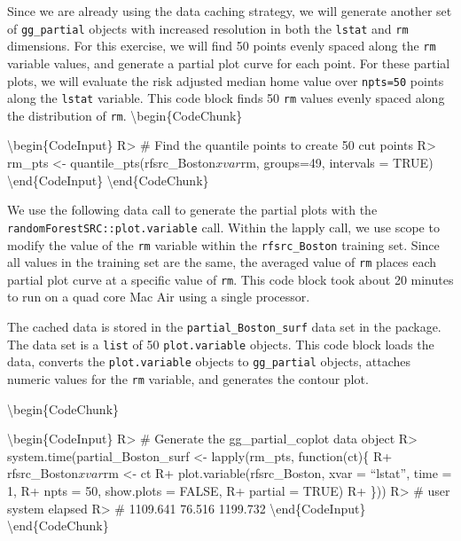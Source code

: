 \documentclass[article]{jss}
\begin{document}
Since we are already using the data caching strategy, we will generate
another set of \texttt{gg\_partial} objects with increased resolution in
both the \texttt{lstat} and \texttt{rm} dimensions. For this exercise,
we will find 50 points evenly spaced along the \texttt{rm} variable
values, and generate a partial plot curve for each point. For these
partial plots, we will evaluate the risk adjusted median home value over
\texttt{npts=50} points along the \texttt{lstat} variable. This code
block finds 50 \texttt{rm} values evenly spaced along the distribution
of \texttt{rm}. \textbackslash{}begin\{CodeChunk\}

\textbackslash{}begin\{CodeInput\} R\textgreater{} \# Find the quantile
points to create 50 cut points R\textgreater{} rm\_pts \textless{}-
quantile\_pts(rfsrc\_Boston\(xvar\)rm, groups=49, intervals = TRUE)
\textbackslash{}end\{CodeInput\} \textbackslash{}end\{CodeChunk\}

We use the following data call to generate the partial plots with the
\texttt{randomForestSRC::plot.variable} call. Within the lapply call, we
use scope to modify the value of the \texttt{rm} variable within the
\texttt{rfsrc\_Boston} training set. Since all values in the training
set are the same, the averaged value of \texttt{rm} places each partial
plot curve at a specific value of \texttt{rm}. This code block took
about 20 minutes to run on a quad core Mac Air using a single processor.

The cached data is stored in the \texttt{partial\_Boston\_surf} data set
in the  package. The data set is a \texttt{list} of
50 \texttt{plot.variable} objects. This code block loads the data,
converts the \texttt{plot.variable} objects to \texttt{gg\_partial}
objects, attaches numeric values for the \texttt{rm} variable, and
generates the contour plot.

\textbackslash{}begin\{CodeChunk\}

\textbackslash{}begin\{CodeInput\} R\textgreater{} \# Generate the
gg\_partial\_coplot data object R\textgreater{}
system.time(partial\_Boston\_surf \textless{}- lapply(rm\_pts,
function(ct)\{ R+ rfsrc\_Boston\(xvar\)rm \textless{}- ct R+
plot.variable(rfsrc\_Boston, xvar = ``lstat'', time = 1, R+ npts = 50,
show.plots = FALSE, R+ partial = TRUE) R+ \})) R\textgreater{} \# user
system elapsed R\textgreater{} \# 1109.641 76.516 1199.732
\textbackslash{}end\{CodeInput\} \textbackslash{}end\{CodeChunk\}
\end{document}
